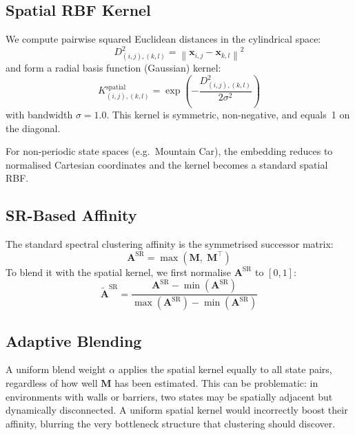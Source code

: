 \subsection{Spatial RBF Kernel}

We compute pairwise squared Euclidean distances in the cylindrical space:
\begin{equation}
D^2_{(i,j),(k,l)} = \left\|\mathbf{x}_{i,j} - \mathbf{x}_{k,l}\right\|^2
\end{equation}
and form a radial basis function (Gaussian) kernel:
\begin{equation}
K^{\text{spatial}}_{(i,j),(k,l)} = \exp\!\left(-\frac{D^2_{(i,j),(k,l)}}{2\sigma^2}\right)
\end{equation}
with bandwidth $\sigma = 1.0$.  This kernel is symmetric, non-negative,
and equals~1 on the diagonal.

For non-periodic state spaces (e.g.\ Mountain Car), the embedding reduces
to normalised Cartesian coordinates and the kernel becomes a standard
spatial RBF.

\subsection{SR-Based Affinity}

The standard spectral clustering affinity is the symmetrised successor
matrix:
\begin{equation}
\mathbf{A}^{\text{SR}} = \max\!\left(\mathbf{M},\;\mathbf{M}^\top\right)
\end{equation}
To blend it with the spatial kernel, we first normalise
$\mathbf{A}^{\text{SR}}$ to $[0, 1]$:
\begin{equation}
\widetilde{\mathbf{A}}^{\text{SR}} = \frac{\mathbf{A}^{\text{SR}} - \min\!\left(\mathbf{A}^{\text{SR}}\right)}{\max\!\left(\mathbf{A}^{\text{SR}}\right) - \min\!\left(\mathbf{A}^{\text{SR}}\right)}
\end{equation}

\subsection{Adaptive Blending}

A uniform blend weight $\alpha$ applies the spatial kernel equally to all
state pairs, regardless of how well $\mathbf{M}$ has been estimated.
This can be problematic: in environments with walls or barriers, two
states may be spatially adjacent but dynamically disconnected.  A uniform
spatial kernel would incorrectly boost their affinity, blurring the very
bottleneck structure that clustering should discover.

